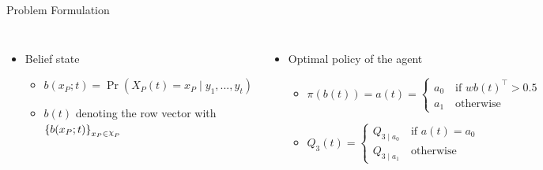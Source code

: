 \documentclass[
	english,%
	aspectratio=169,%
	color={accentcolor=3b},
	logo=true,%
	colorframetitle=false,%
	]{tudabeamer}
\DeclareRobustCommand{\rchi}{{\mathpalette\irchi\relax}}
\newcommand{\irchi}[2]{\raisebox{\depth}{$#1\chi$}}
\begin{document}
\begin{frame}{Problem Formulation}
{
	}
\begin{columns}[onlytextwidth,]
		\begin{itemize}
			\item Belief state
			\begin{itemize}
				\item $ b(x_P; t) = \operatorname{Pr}( X_P(t) = x_P \mid y_{1}, ..., y_{t}) $
				\vspace{5pt}
				\item $ b(t) $ denoting the row vector with $ \left\lbrace b(x_P;t)\right\rbrace_{x_P \in \rchi_P} $
			\end{itemize}
		\end{itemize}
		\begin{itemize}
			\item Optimal policy of the agent
			\begin{itemize}
				\item $ \pi(b(t)) = a(t) = 
						\begin{cases}
						a_0  \quad \text{if } wb(t)^\intercal > 0.5 \\
						a_1  \quad \text{otherwise}
						\end{cases} $
				\vspace{5pt}
				\item $ Q_3(t)  = \begin{cases}
				Q_{3\mid a_{0}}  \quad \text{if } a(t) = a_0 \\
				Q_{3\mid a_{1}}  \quad \text{otherwise}
				\end{cases} $
			\end{itemize}
		\end{itemize}
\end{columns}
\end{frame}
\end{document}
